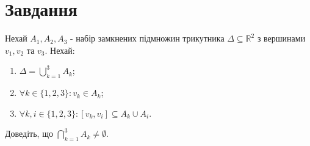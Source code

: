 
\chapter{Завдання \theHchapter}

\begin{tcolorbox}[title=Завдання]
    Нехай $A_{1}, A_{2}, A_{3}$ - набір замкнених підмножин трикутника 
    $\Delta \subseteq \mathbb{R}^{2}$ з вершинами 
    $v_{1}, v_{2}$ та $v_{3}$. 
    Нехай:
    \begin{enumerate}
    \item $\Delta=\bigcup_{k=1}^{3} A_{k}$;

    \item $\forall k \in\{1,2,3\}: v_{k} \in A_{k}$;

    \item $\forall k, i \in\{1,2,3\}:\left[v_{k}, v_{i}\right] \subseteq A_{k} \cup A_{i}$.

    \end{enumerate}

    Доведіть, що $\bigcap_{k=1}^{3} A_{k} \neq \emptyset$.


\end{tcolorbox}



